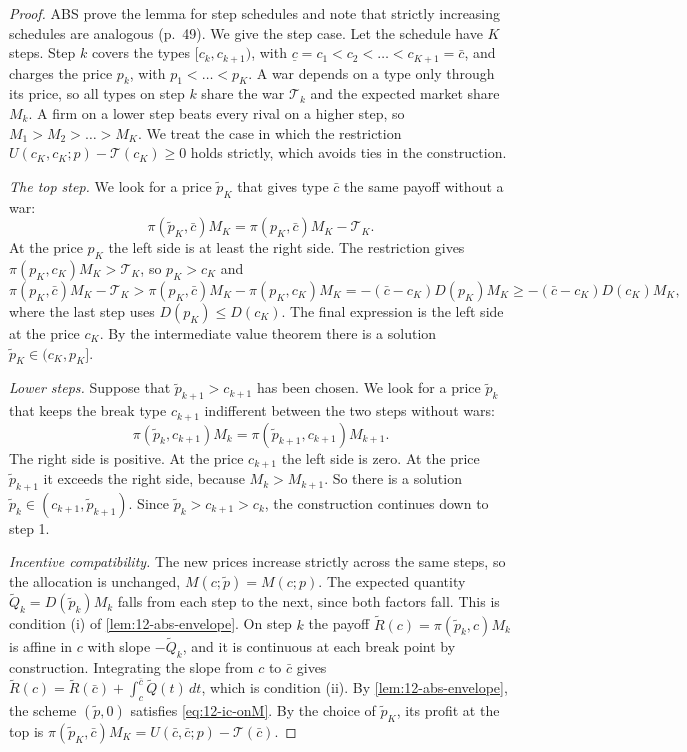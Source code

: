 \begin{proof}
ABS prove the lemma for step schedules and note that strictly increasing schedules are analogous (p.~49). We give the
step case. Let the schedule have $K$ steps. Step $k$ covers the types $[c_k, c_{k+1})$, with
$\underline c = c_1 < c_2 < \dots < c_{K+1} = \bar c$, and charges the price $p_k$, with $p_1 < \dots < p_K$. A war
depends on a type only through its price, so all types on step $k$ share the war $\mathcal T_k$ and the expected
market share $M_k$. A firm on a lower step beats every rival on a higher step, so $M_1 > M_2 > \dots > M_K$. We treat
the case in which the restriction $U(c_K, c_K; p) - \mathcal T(c_K) \ge 0$ holds strictly, which avoids ties in the
construction.

\emph{The top step.} We look for a price $\tilde p_K$ that gives type $\bar c$ the same payoff without a war:
\begin{equation*}
\pi(\tilde p_K, \bar c)M_K = \pi(p_K, \bar c)M_K - \mathcal T_K .
\end{equation*}
At the price $p_K$ the left side is at least the right side. The restriction gives $\pi(p_K, c_K)M_K > \mathcal T_K$,
so $p_K > c_K$ and
\begin{equation*}
\pi(p_K, \bar c)M_K - \mathcal T_K > \pi(p_K, \bar c)M_K - \pi(p_K, c_K)M_K = -(\bar c - c_K)D(p_K)M_K
\ge -(\bar c - c_K)D(c_K)M_K ,
\end{equation*}
where the last step uses $D(p_K) \le D(c_K)$. The final expression is the left side at the price $c_K$. By the
intermediate value theorem there is a solution $\tilde p_K \in (c_K, p_K]$.

\emph{Lower steps.} Suppose that $\tilde p_{k+1} > c_{k+1}$ has been chosen. We look for a price $\tilde p_k$ that
keeps the break type $c_{k+1}$ indifferent between the two steps without wars:
\begin{equation*}
\pi(\tilde p_k, c_{k+1})M_k = \pi(\tilde p_{k+1}, c_{k+1})M_{k+1} .
\end{equation*}
The right side is positive. At the price $c_{k+1}$ the left side is zero. At the price $\tilde p_{k+1}$ it exceeds the
right side, because $M_k > M_{k+1}$. So there is a solution $\tilde p_k \in (c_{k+1}, \tilde p_{k+1})$. Since
$\tilde p_k > c_{k+1} > c_k$, the construction continues down to step 1.

\emph{Incentive compatibility.} The new prices increase strictly across the same steps, so the allocation is
unchanged, $M(c; \tilde p) = M(c; p)$. The expected quantity $\tilde Q_k = D(\tilde p_k)M_k$ falls from each step to the
next, since both factors fall. This is condition (i) of \cref{lem:12-abs-envelope}. On step $k$ the payoff
$\tilde R(c) = \pi(\tilde p_k, c)M_k$ is affine in $c$ with slope $-\tilde Q_k$, and it is continuous at each break
point by construction. Integrating the slope from $c$ to $\bar c$ gives
$\tilde R(c) = \tilde R(\bar c) + \int_c^{\bar c}\tilde Q(t)\,dt$, which is condition (ii). By
\cref{lem:12-abs-envelope}, the scheme $(\tilde p, 0)$ satisfies \eqref{eq:12-ic-onM}. By the choice of $\tilde p_K$,
its profit at the top is $\pi(\tilde p_K, \bar c)M_K = U(\bar c, \bar c; p) - \mathcal T(\bar c)$.
\end{proof}

